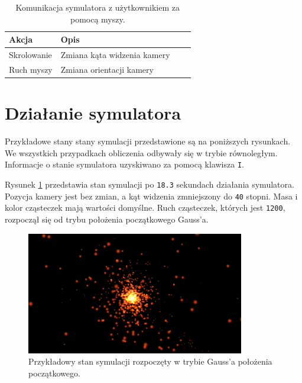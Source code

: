 \documentclass[12pt, twoside, openany]{report}
\begin{document}
\begin{table}[H]
\center
\footnotesize
\begin{tabulary}{\linewidth}{|L|L|L|L|}

\hline
\textbf{Akcja} & \textbf{Opis} \\ \hline
Skrolowanie & Zmiana kąta widzenia kamery \\ \hline
Ruch myszy & Zmiana orientacji kamery \\ \hline

\end{tabulary}
\caption{Komunikacja symulatora z użytkownikiem za pomocą myszy.}
\label{table:interakcja_mysz}
\end{table}


\section{Działanie symulatora}

Przykładowe stany stany symulacji przedstawione są na poniższych rysunkach. We wszystkich przypadkach obliczenia odbywały się w trybie równoległym. Informacje o stanie symulatora uzyskiwano za pomocą klawisza \texttt{I}.

Rysunek \ref{fig:stan1} przedstawia stan symulacji po \texttt{18.3} sekundach działania symulatora. Pozycja kamery jest bez zmian, a kąt widzenia zmniejszony do \texttt{40} stopni. Masa i kolor cząsteczek mają wartości domyślne. Ruch cząsteczek, których jest \texttt{1200}, rozpoczął się od trybu położenia początkowego Gauss'a.


\begin{figure}[H]
\centering
\includegraphics[width=0.85\textwidth]{1_004.png}
\caption{Przykładowy stan symulacji rozpoczęty w trybie Gauss'a położenia początkowego.}
\label{fig:stan1}
\end{figure}
\end{document}
